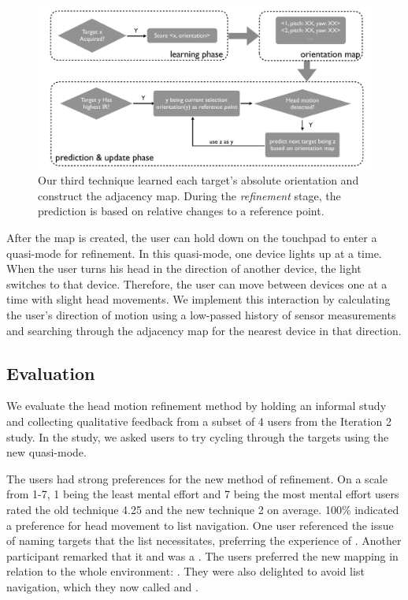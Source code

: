 \begin{figure}[t]
\centering
\includegraphics[width=1\columnwidth]{figures/third_technique3.pdf}
\caption{Our third technique learned each target's absolute orientation and construct the adjacency map. During the {\em refinement} stage, the prediction is based on relative changes to a reference point.}
\label{fig:third_technique}
\end{figure}

After the map is created, the user can hold down on the touchpad to enter a
quasi-mode for refinement. In this quasi-mode, one device lights up at a time. When the user turns his head in the direction of another device, the light switches to that device. Therefore, the user can move between devices one at a time with slight head movements. We implement this interaction by calculating the user's direction of motion using a low-passed history of sensor measurements and searching through the adjacency map for
the nearest device in that direction. 

\subsection{Evaluation}
We evaluate the head motion refinement method by holding an informal study and collecting qualitative feedback from a subset of 4 users from the Iteration 2 study. In the study, we asked users to try cycling through the targets using the new quasi-mode.

The users had strong preferences for the new method of refinement. On a scale from 1-7, 1 being the least mental effort and 7 being the most mental effort users rated the old technique 4.25 and the new technique 2 on average. 100\% indicated a preference for head movement to list navigation. One user referenced the issue of naming targets that the list necessitates, preferring the experience of . Another participant remarked that it  and was a . The users preferred the new mapping in relation to the whole environment: . They were also delighted to avoid list navigation, which they now called  and .

